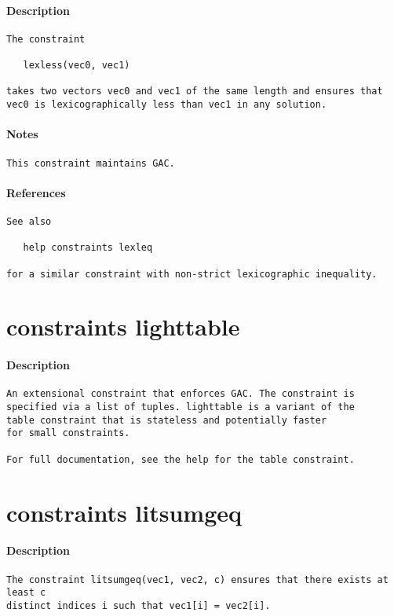 \paragraph{Description}
{\footnotesize
\begin{verbatim}
The constraint

   lexless(vec0, vec1)

takes two vectors vec0 and vec1 of the same length and ensures that
vec0 is lexicographically less than vec1 in any solution.
\end{verbatim}
}
\paragraph{Notes}
{\footnotesize
\begin{verbatim}
This constraint maintains GAC.
\end{verbatim}
}
\paragraph{References}
{\footnotesize
\begin{verbatim}
See also

   help constraints lexleq

for a similar constraint with non-strict lexicographic inequality.
\end{verbatim}
}
\section{constraints lighttable}
\paragraph{Description}
{\footnotesize
\begin{verbatim}
An extensional constraint that enforces GAC. The constraint is
specified via a list of tuples. lighttable is a variant of the
table constraint that is stateless and potentially faster
for small constraints.

For full documentation, see the help for the table constraint.
\end{verbatim}
}
\section{constraints litsumgeq}
\paragraph{Description}
{\footnotesize
\begin{verbatim}
The constraint litsumgeq(vec1, vec2, c) ensures that there exists at least c
distinct indices i such that vec1[i] = vec2[i].
\end{verbatim}
}
